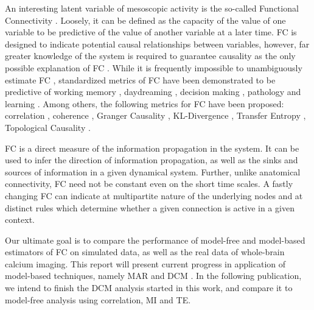 \documentclass[a4paper,10pt]{article}
\begin{document}
An interesting latent variable of mesoscopic activity is the so-called Functional Connectivity \cite{friston_functional_2011, hutchison_dynamic_2013}. Loosely, it can be defined as the capacity of the value of one variable to be predictive of the value of another variable at a later time. FC is designed to indicate potential causal relationships between variables, however, far greater knowledge of the system is required to guarantee causality as the only possible explanation of FC \cite{wibral_directed_2014}. While it is frequently impossible to unambiguously estimate FC \cite{wibral_directed_2014}, standardized metrics of FC have been demonstrated to be predictive of working memory \cite{greicius_functional_2003, esposito_independent_2006}, daydreaming \cite{kucyi_dynamic_2014}, decision making \cite{lizier_multivariate_2010}, pathology \cite{sakoglu_classification_2009} and learning \cite{bassett_dynamic_2011}. Among others, the following metrics for FC have been proposed: correlation \cite{greicius_persistent_2008, thompson_short-time_2012, viviani_resting_2011}, coherence \cite{pascual-marqui_isolated_2014}, Granger Causality \cite{zadeh_extension_1950, amblard_relation_2012, valdes-sosa_effective_2011, seth_granger_2015}, KL-Divergence \cite{amari_information_2001, nakahara_information-geometric_2002}, Transfer Entropy \cite{wibral_directed_2014, vicente_transfer_2010, nigam_rich-club_2016, lizier_differentiating_2010, lizier_multivariate_2010, ito_extending_2011, schreiber_measuring_2000}, Topological Causality \cite{harnack_topological_2017}.

FC is a direct measure of the information propagation in the system. It can be used to infer the direction of information propagation, as well as the sinks and sources of information in a given dynamical system. Further, unlike anatomical connectivity, FC need not be constant even on the short time scales. A fastly changing FC can indicate at multipartite nature of the underlying nodes and at distinct rules which determine whether a given connection is active in a given context.

Our ultimate goal is to compare the performance of model-free and model-based estimators of FC on simulated data, as well as the real data of whole-brain calcium imaging. This report will present current progress in application of model-based techniques, namely MAR \cite{penny_bayesian_2002} and DCM \cite{stephan_dynamic_2007, friston_functional_2011, frassle_regression_2017, jung_dynamic_2019}. In the following publication, we intend to finish the DCM analysis started in this work, and compare it to model-free analysis using correlation, MI and TE.
\end{document}
